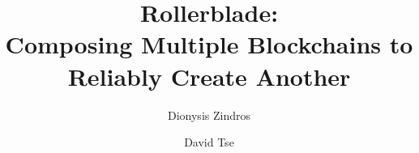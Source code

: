 \title{
  Rollerblade:\\
  Composing Multiple Blockchains to
  Reliably Create Another
}
\ifanonymous{\iflncs
\author{}\institute{}
\fi}
\else
\author{
  Dionysis Zindros\and
  David Tse
}
\iflncs
{}
\else
{}
\fi
\fi
